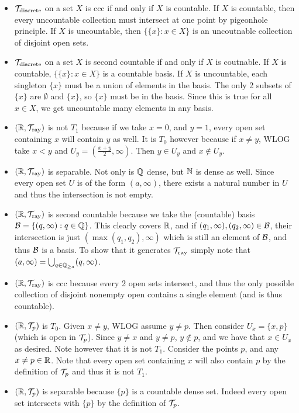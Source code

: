 \documentclass{article}
\begin{document}
{\begin{itemize}
        \item $\mathcal{T}_{\text{discrete}}$ on a set $X$ is ccc if and only if $X$ is countable. If $X$ is countable, then every uncountable collection must intersect at one point by pigeonhole principle. If $X$ is uncountable, then $\{\{x\}: x\in X\}$ is an uncoutnable collection of disjoint open sets.
        \item $\mathcal{T}_{\text{discrete}}$ on a set $X$ is second countable if and only if $X$ is coutnable. If $X$ is countable, $\{\{x\}: x\in X\}$ is a countable basis. If $X$ is uncountable, each singleton $\{x\}$ must be a union of elements in the basis. The only 2 subsets of $\{x\}$ are $\emptyset$ and $\{x\}$, so $\{x\}$ must be in the basis. Since this is true for all $x\in X$, we get uncountable many elements in any basis.
        \item $(\mathbb{R}, \mathcal{T}_{\text{ray}})$ is not $T_{1}$ because if we take $x = 0$, and $y = 1$, every open set containing $x$ will contain $y$ as well. It is $T_{0}$ however because if $x\neq y$, WLOG take $x < y$ and $U_{y} = (\frac{x+y}{2}, \infty)$. Then $y\in U_{y}$ and $x\not\in U_{y}$.
        \item $(\mathbb{R}, \mathcal{T}_{\text{ray}})$ is separable. Not only is $\mathbb{Q}$ dense, but $\mathbb{N}$ is dense as well. Since every open set $U$ is of the form $(a,\infty)$, there exists a natural number in $U$ and thus the intersection is not empty.
        \item $(\mathbb{R}, \mathcal{T}_{\text{ray}})$ is second countable because we take the (countable) basis $\mathcal{B} = \{(q,\infty): q\in \mathbb{Q}\}$. This clearly covers $\mathbb{R}$, and if $(q_{1}, \infty), (q_{2}, \infty)\in \mathcal{B}$, their intersection is just $(\max(q_{1}, q_{2}),\infty)$ which is still an element of $\mathcal{B}$, and thus $\mathcal{B}$ is a basis. To show that it generates $\mathcal{T}_{\text{ray}}$ simply note that $(a,\infty) = \bigcup_{q\in \mathbb{Q}_{ \geq a}}(q, \infty)$.
        \item $(\mathbb{R}, \mathcal{T}_{\text{ray}})$ is ccc because every 2 open sets intersect, and thus the only possible collection of disjoint nonempty open contains a single element (and is thus countable).
        \item $(\mathbb{R}, \mathcal{T}_{p})$ is $T_{0}$. Given $x \neq y$, WLOG assume $y\neq p$. Then consider $U_{x} = \{x, p\}$ (which is open in $\mathcal{T}_{p}$). Since $y\neq x$ and $y\neq p$, $y\not\in p$, and we have that $x\in U_{x}$ as desired. Note however that it is not $T_{1}$. Consider the points $p$, and any $x\neq p\in \mathbb{R}$. Note that every open set containing $x$ will also contain $p$ by the definition of $\mathcal{T}_{p}$ and thus it is not $T_{1}$.
        \item $(\mathbb{R}, \mathcal{T}_{p})$ is separable because $\{p\}$ is a countable dense set. Indeed every open set intersects with $\{p\}$ by the definition of $\mathcal{T}_{p}$.

\end{itemize}}
\end{document}
